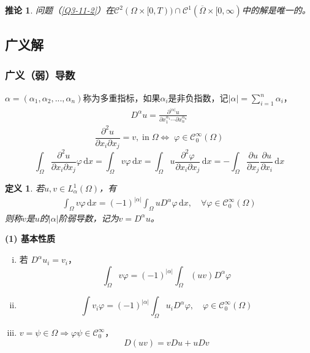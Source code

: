 \documentclass[11pt, a4paper]{article}
\theoremstyle{theorem}
\newtheorem{definition}[thm]{定义}
\newtheorem{cor}[thm]{推论}
\newcommand{\intd}[1]{\,\mathrm{d}{#1}}
\begin{document}
\begin{cor}
    问题（\ref{Q3-11-2}）在$\mathcal{C}^2(\Omega \times [0,T)) \cap \mathcal{C}^1(\overline{\Omega} \times [0, \infty)$中的解是唯一的。
\end{cor}

\subsection{广义解}

\subsubsection{广义（弱）导数}

$\alpha = (\alpha_1, \alpha_2, ..., \alpha_n)$称为多重指标，如果$\alpha_i$是非负指数，记$|\alpha| = \sum_{i=1}^n \alpha_i$，
\begin{align*}
    D^\alpha u = \frac{\partial^{|\alpha|} u}{\partial x_1^{\alpha_1} \cdots \partial x_n^{\alpha_n}}
\end{align*}
$$
\frac{\partial^2 u}{\partial x_i \partial x_j} = v, \; \text{in} \; \Omega \Leftrightarrow \; \varphi \in \mathcal{C}_0^\infty(\Omega)
$$
$$
\int_\Omega \frac{\partial^2 u}{\partial x_i \partial x_j} \varphi \intd x = \int_\Omega v \varphi \intd x = \int_\Omega u \frac{\partial^2 \varphi}{\partial x_i \partial x_j} \intd x = - \int_\Omega \frac{\partial u}{ \partial x_j} \frac{\partial u}{\partial x_i} \intd x
$$

\begin{definition}
若$u,v \in L^1_\alpha (\Omega)$，有
\begin{align}
    \int_\Omega v \varphi \intd x = (-1)^{|\alpha|} \int_\Omega u D^\alpha \varphi \intd x, \quad \forall \varphi \in \mathcal{C}_0^\infty(\Omega)
\end{align}
则称$v$是$u$的$|\alpha|$阶弱导数，记为$v = D^\alpha u$。
\end{definition}

\textbf{(1) 基本性质}
\begin{enumerate}[(i)]
    \item 若 $D^\alpha u_i = v_i$，$$
    \int_\Omega v \varphi = (-1)^{|\alpha|} \int_\Omega (uv) D^\alpha \varphi
    $$
    \item $$\int v_i \varphi = (-1)^{|\alpha|} \int_\Omega u_i D^\alpha \varphi, \quad \varphi \in \mathcal{C}_0^\infty(\Omega)$$
    \item $v = \psi \in \Omega \Longrightarrow \varphi \psi \in \mathcal{C}_0^\infty$，
    $$
    D(uv) = v D u  + u D v
    $$
\end{enumerate}
\end{document}
